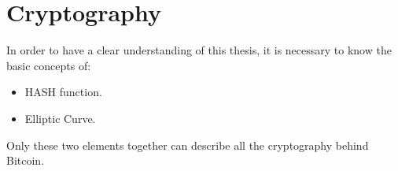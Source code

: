 
\chapter{Cryptography} %

\label{EC} %


\newcommand{\keyword}[1]{\textbf{#1}}
\newcommand{\tabhead}[1]{\textbf{#1}}
\newcommand{\code}[1]{\texttt{#1}}
\newcommand{\file}[1]{\texttt{\bfseries#1}}
\newcommand{\option}[1]{\texttt{\itshape#1}}


In order to have a clear understanding of this thesis, it is necessary to know the basic concepts of:
\begin{itemize}[label=$\checkmark$]
	\item HASH function.
	\item Elliptic Curve.
\end{itemize}
Only these two elements together can describe all the cryptography behind Bitcoin.



